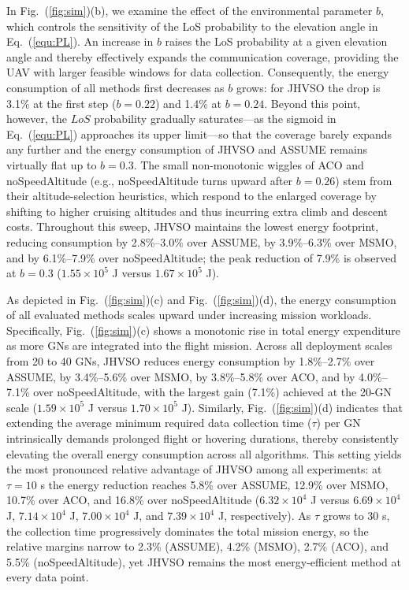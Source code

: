 In Fig.~(\ref{fig:sim})(b), we examine the effect of the environmental parameter $b$, which controls the sensitivity of the LoS probability to the elevation angle in Eq.~(\ref{equ:PL}).
An increase in $b$  raises the LoS probability at a given elevation angle and thereby effectively expands the communication coverage, providing the UAV with larger feasible windows for data collection.
Consequently, the energy consumption of all methods first decreases as $b$  grows: for JHVSO the drop is 3.1\% at the first step ($b=0.22$) and 1.4\% at $b=0.24$.
Beyond this point, however, the $LoS$ probability gradually saturates---as the sigmoid in Eq.~(\ref{equ:PL}) approaches its upper limit---so that the coverage barely expands any further and the energy consumption of JHVSO and ASSUME remains virtually flat up to $b=0.3$.
The small non-monotonic wiggles of ACO and noSpeedAltitude (e.g., noSpeedAltitude turns upward after $b=0.26$) stem from their altitude-selection heuristics, which respond to the enlarged coverage by shifting to higher cruising altitudes and thus incurring extra climb and descent costs.
Throughout this sweep, JHVSO maintains the lowest energy footprint, reducing consumption by 2.8\%--3.0\% over ASSUME, by 3.9\%--6.3\% over MSMO, and by 6.1\%--7.9\% over noSpeedAltitude; the peak reduction of 7.9\% is observed at $b=0.3$ ($1.55\times10^{5}$ J versus $1.67\times10^{5}$ J).

As depicted in Fig.~(\ref{fig:sim})(c) and Fig.~(\ref{fig:sim})(d), the energy consumption of all evaluated methods scales upward under increasing mission workloads.
Specifically, Fig.~(\ref{fig:sim})(c) shows a monotonic rise in total energy expenditure as more GNs are integrated into the flight mission.
Across all deployment scales from 20 to 40 GNs, JHVSO reduces energy consumption by 1.8\%--2.7\% over ASSUME, by 3.4\%--5.6\% over MSMO, by 3.8\%--5.8\% over ACO, and by 4.0\%--7.1\% over noSpeedAltitude, with the largest gain (7.1\%) achieved at the 20-GN scale ($1.59\times10^{5}$ J versus $1.70\times10^{5}$ J).
Similarly, Fig.~(\ref{fig:sim})(d) indicates that extending the average minimum required data collection time ($\tau$) per GN intrinsically demands prolonged flight or hovering durations, thereby consistently elevating the overall energy consumption across all algorithms.
This setting yields the most pronounced relative advantage of JHVSO among all experiments: at $\tau=10$ s the energy reduction reaches 5.8\% over ASSUME, 12.9\% over MSMO, 10.7\% over ACO, and 16.8\% over noSpeedAltitude ($6.32\times10^{4}$ J versus $6.69\times10^{4}$ J, $7.14\times10^{4}$ J, $7.00\times10^{4}$ J, and $7.39\times10^{4}$ J, respectively). As $\tau$ grows to 30 s, the collection time progressively dominates the total mission energy, so the relative margins narrow to 2.3\% (ASSUME), 4.2\% (MSMO), 2.7\% (ACO), and 5.5\% (noSpeedAltitude), yet JHVSO remains the most energy-efficient method at every data point.

